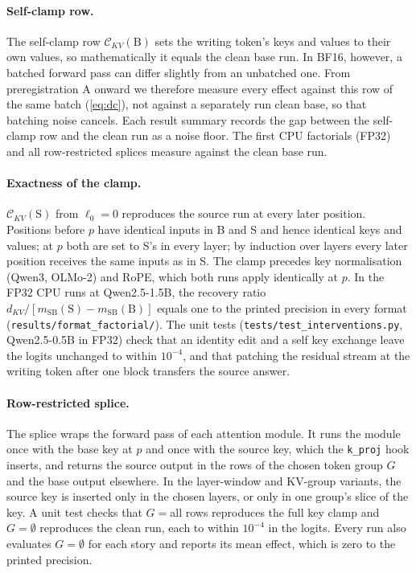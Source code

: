 \paragraph{Self-clamp row.} The self-clamp row $\mathcal{C}_{KV}(\mathrm{B})$ sets the writing token's keys and values to their own values, so mathematically it equals the clean base run. In BF16, however, a batched forward pass can differ slightly from an unbatched one. From preregistration A onward we therefore measure every effect against this row of the same batch (\cref{eq:dc}), not against a separately run clean base, so that batching noise cancels. Each result summary records the gap between the self-clamp row and the clean run as a noise floor. The first CPU factorials (FP32) and all row-restricted splices measure against the clean base run.

\paragraph{Exactness of the clamp.} $\mathcal{C}_{KV}(\mathrm{S})$ from $\ell_0 = 0$ reproduces the source run at every later position. Positions before $p$ have identical inputs in B and S and hence identical keys and values; at $p$ both are set to S's in every layer; by induction over layers every later position receives the same inputs as in S. The clamp precedes key normalisation (Qwen3, OLMo-2) and RoPE, which both runs apply identically at $p$. In the FP32 CPU runs at Qwen2.5-1.5B, the recovery ratio $d_{KV} / [m_{\mathrm{SB}}(\mathrm{S}) - m_{\mathrm{SB}}(\mathrm{B})]$ equals one to the printed precision in every format (\texttt{results/format\_factorial/}). The unit tests (\texttt{tests/test\_interventions.py}, Qwen2.5-0.5B in FP32) check that an identity edit and a self key exchange leave the logits unchanged to within $10^{-4}$, and that patching the residual stream at the writing token after one block transfers the source answer.

\paragraph{Row-restricted splice.} The splice wraps the forward pass of each attention module. It runs the module once with the base key at $p$ and once with the source key, which the \texttt{k\_proj} hook inserts, and returns the source output in the rows of the chosen token group $G$ and the base output elsewhere. In the layer-window and KV-group variants, the source key is inserted only in the chosen layers, or only in one group's slice of the key. A unit test checks that $G = {}$all rows reproduces the full key clamp and $G = \emptyset$ reproduces the clean run, each to within $10^{-4}$ in the logits. Every run also evaluates $G = \emptyset$ for each story and reports its mean effect, which is zero to the printed precision.

